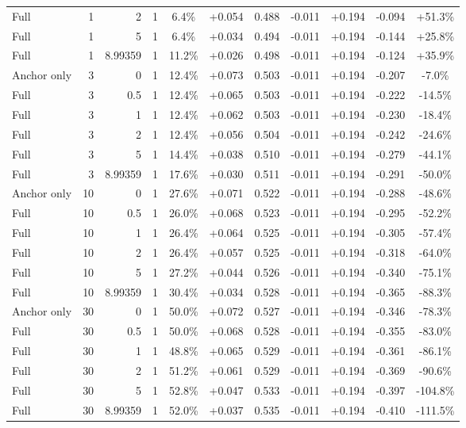 \begin{table}[htbp]
\begin{tabular}{lrrrccccccc}
Full & 1 & 2 & 1 & 6.4\% & +0.054 & 0.488 & -0.011 & +0.194 & -0.094 & +51.3\% \\
Full & 1 & 5 & 1 & 6.4\% & +0.034 & 0.494 & -0.011 & +0.194 & -0.144 & +25.8\% \\
Full & 1 & 8.99359 & 1 & 11.2\% & +0.026 & 0.498 & -0.011 & +0.194 & -0.124 & +35.9\% \\
Anchor only & 3 & 0 & 1 & 12.4\% & +0.073 & 0.503 & -0.011 & +0.194 & -0.207 & -7.0\% \\
Full & 3 & 0.5 & 1 & 12.4\% & +0.065 & 0.503 & -0.011 & +0.194 & -0.222 & -14.5\% \\
Full & 3 & 1 & 1 & 12.4\% & +0.062 & 0.503 & -0.011 & +0.194 & -0.230 & -18.4\% \\
Full & 3 & 2 & 1 & 12.4\% & +0.056 & 0.504 & -0.011 & +0.194 & -0.242 & -24.6\% \\
Full & 3 & 5 & 1 & 14.4\% & +0.038 & 0.510 & -0.011 & +0.194 & -0.279 & -44.1\% \\
Full & 3 & 8.99359 & 1 & 17.6\% & +0.030 & 0.511 & -0.011 & +0.194 & -0.291 & -50.0\% \\
Anchor only & 10 & 0 & 1 & 27.6\% & +0.071 & 0.522 & -0.011 & +0.194 & -0.288 & -48.6\% \\
Full & 10 & 0.5 & 1 & 26.0\% & +0.068 & 0.523 & -0.011 & +0.194 & -0.295 & -52.2\% \\
Full & 10 & 1 & 1 & 26.4\% & +0.064 & 0.525 & -0.011 & +0.194 & -0.305 & -57.4\% \\
Full & 10 & 2 & 1 & 26.4\% & +0.057 & 0.525 & -0.011 & +0.194 & -0.318 & -64.0\% \\
Full & 10 & 5 & 1 & 27.2\% & +0.044 & 0.526 & -0.011 & +0.194 & -0.340 & -75.1\% \\
Full & 10 & 8.99359 & 1 & 30.4\% & +0.034 & 0.528 & -0.011 & +0.194 & -0.365 & -88.3\% \\
Anchor only & 30 & 0 & 1 & 50.0\% & +0.072 & 0.527 & -0.011 & +0.194 & -0.346 & -78.3\% \\
Full & 30 & 0.5 & 1 & 50.0\% & +0.068 & 0.528 & -0.011 & +0.194 & -0.355 & -83.0\% \\
Full & 30 & 1 & 1 & 48.8\% & +0.065 & 0.529 & -0.011 & +0.194 & -0.361 & -86.1\% \\
Full & 30 & 2 & 1 & 51.2\% & +0.061 & 0.529 & -0.011 & +0.194 & -0.369 & -90.6\% \\
Full & 30 & 5 & 1 & 52.8\% & +0.047 & 0.533 & -0.011 & +0.194 & -0.397 & -104.8\% \\
Full & 30 & 8.99359 & 1 & 52.0\% & +0.037 & 0.535 & -0.011 & +0.194 & -0.410 & -111.5\% \\

\end{tabular}
\end{table}
